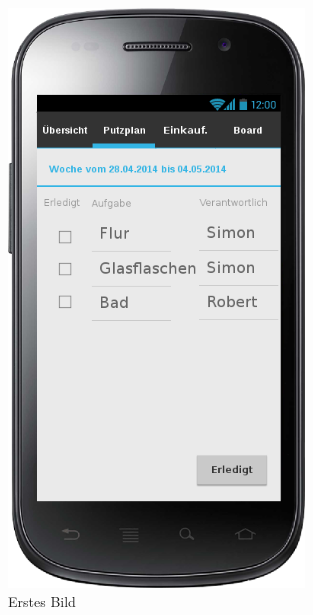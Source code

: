 \begin{figure}[htbp] 
  \centering
     \includegraphics[width=0.7\textwidth]{anhang/mockups/putzplanerledigt.png}
  \caption{Erstes Bild}
  \label{fig:Bild1}
\end{figure}

